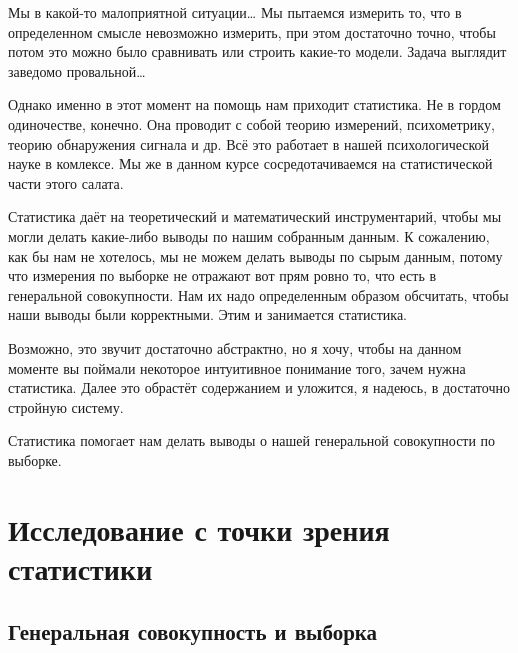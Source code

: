 \documentclass[
  letterpaper,
]{scrbook}
\theoremstyle{definition}
\theoremstyle{remark}
\begin{document}
Мы в какой-то малоприятной ситуации\ldots{} Мы пытаемся измерить то, что
в определенном смысле невозможно измерить, при этом достаточно точно,
чтобы потом это можно было сравнивать или строить какие-то модели.
Задача выглядит заведомо провальной\ldots{}

Однако именно в этот момент на помощь нам приходит статистика. Не в
гордом одиночестве, конечно. Она проводит с собой теорию измерений,
психометрику, теорию обнаружения сигнала и др. Всё это работает в нашей
психологической науке в комлексе. Мы же в данном курсе сосредотачиваемся
на статистической части этого салата.

Статистика даёт на теоретический и математический инструментарий, чтобы
мы могли делать какие-либо выводы по нашим собранным данным. К
сожалению, как бы нам не хотелось, мы не можем делать выводы по сырым
данным, потому что измерения по выборке не отражают вот прям ровно то,
что есть в генеральной совокупности. Нам их надо определенным образом
обсчитать, чтобы наши выводы были корректными. Этим и занимается
статистика.

Возможно, это звучит достаточно абстрактно, но я хочу, чтобы на данном
моменте вы поймали некоторое интуитивное понимание того, зачем нужна
статистика. Далее это обрастёт содержанием и уложится, я надеюсь, в
достаточно стройную систему.

\begin{tcolorbox}[enhanced jigsaw, colback=white, bottomrule=.15mm, opacityback=0, opacitybacktitle=0.6, breakable, coltitle=black, colframe=quarto-callout-warning-color-frame, titlerule=0mm, rightrule=.15mm, bottomtitle=1mm, leftrule=.75mm, toptitle=1mm, left=2mm, arc=.35mm, title=\textcolor{quarto-callout-warning-color}{\faExclamationTriangle}\hspace{0.5em}{Важно}, colbacktitle=quarto-callout-warning-color!10!white, toprule=.15mm]

Статистика помогает нам делать выводы о нашей генеральной совокупности
по выборке.

\end{tcolorbox}

\section{Исследование с точки зрения статистики}\label{stats-research}

\subsection{Генеральная совокупность и
выборка}\label{stats-population-sample}
\end{document}
